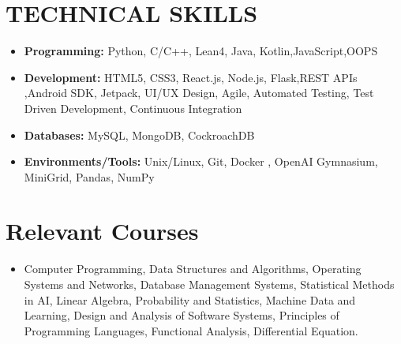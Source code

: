 \documentclass[a4paper,10pt]{article}
\begin{document}
\section{TECHNICAL SKILLS}
\begin{itemize}[leftmargin=0.3in, itemsep=0pt, topsep=0pt]
    \item \textbf{Programming:} Python, C/C++, Lean4, Java, Kotlin,JavaScript,OOPS
    \item \textbf{Development:} HTML5, CSS3, React.js, Node.js, Flask,REST APIs ,Android SDK, Jetpack, UI/UX Design, Agile, Automated Testing, Test Driven Development, Continuous Integration
    \item \textbf{Databases:} MySQL, MongoDB, CockroachDB
   \item \textbf{Environments/Tools:} Unix/Linux, Git, Docker , OpenAI Gymnasium, MiniGrid, Pandas, NumPy
\end{itemize}

\section{\textcolor{headercolor}{Relevant Courses}}
\begin{itemize}[leftmargin=0.3in, itemsep=0pt, topsep=0pt]
    \item Computer Programming, Data Structures and Algorithms, Operating Systems and Networks, Database Management Systems, Statistical Methods in AI, Linear Algebra, Probability and Statistics, Machine Data and Learning, Design and Analysis of Software Systems, Principles of Programming Languages, Functional Analysis, Differential Equation.
\end{itemize}
\end{document}
